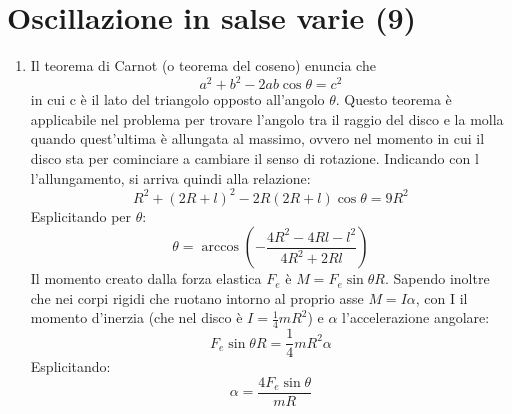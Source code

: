 \documentclass[]{article}
\begin{document}
\section{Oscillazione in salse varie (9)}
	\begin{enumerate}
		\item Il teorema di Carnot (o teorema del coseno) enuncia che
		$$a^2+b^2-2ab\cos{\theta}=c^2$$
		in cui c è il lato del triangolo opposto all'angolo $\theta$. Questo teorema è applicabile nel problema per trovare l'angolo tra il raggio del disco e la molla quando quest'ultima è allungata al massimo, ovvero nel momento in cui il disco sta per cominciare a cambiare il senso di rotazione. Indicando con l l'allungamento, si arriva quindi alla relazione:
		$$R^2+(2R+l)^2-2R(2R+l)\cos{\theta}=9R^2$$
		Esplicitando per $\theta$:
		$$\theta=\arccos\left({-\frac{4R^2-4Rl-l^2}{4R^2+2Rl}}\right)$$
		Il momento creato dalla forza elastica $F_e$ è $M=F_e\sin{\theta}R$. Sapendo inoltre che nei corpi rigidi che ruotano intorno al proprio asse $M=I\alpha$, con I il momento d'inerzia (che nel disco è $I=\frac{1}{4}mR^2$) e $\alpha$ l'accelerazione angolare:
		$$F_e\sin{\theta}R=\frac{1}{4}mR^2\alpha$$
		Esplicitando:
		$$\alpha=\frac{4F_e\sin{\theta}}{mR}$$
	\end{enumerate}
\end{document}
